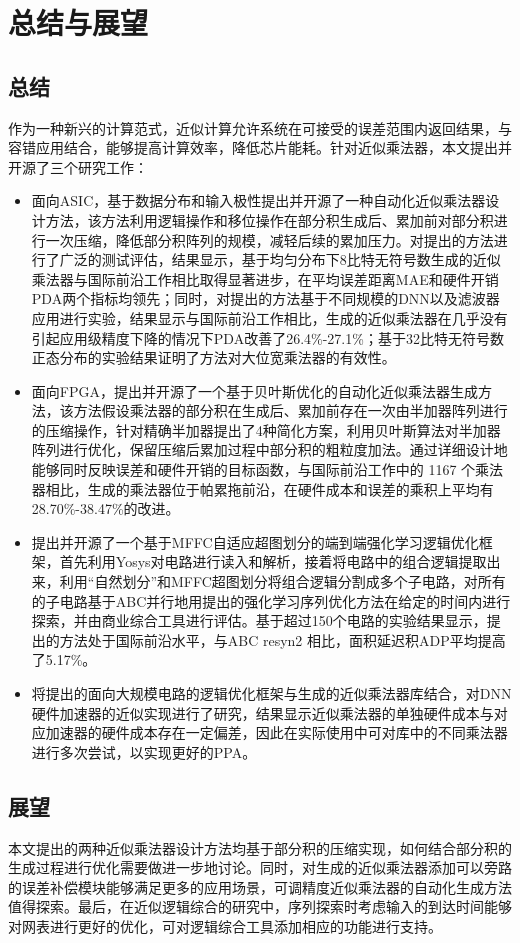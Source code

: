\chapter{总结与展望}

\section{总结}

作为一种新兴的计算范式，近似计算允许系统在可接受的误差范围内返回结果，与容错应用结合，能够提高计算效率，降低芯片能耗。针对近似乘法器，本文提出并开源了三个研究工作：
\begin{itemize}
    \item 面向ASIC，基于数据分布和输入极性提出并开源了一种自动化近似乘法器设计方法，该方法利用逻辑操作和移位操作在部分积生成后、累加前对部分积进行一次压缩，降低部分积阵列的规模，减轻后续的累加压力。对提出的方法进行了广泛的测试评估，结果显示，基于均匀分布下8比特无符号数生成的近似乘法器与国际前沿工作相比取得显著进步，在平均误差距离MAE和硬件开销PDA两个指标均领先；同时，对提出的方法基于不同规模的DNN以及滤波器应用进行实验，结果显示与国际前沿工作相比，生成的近似乘法器在几乎没有引起应用级精度下降的情况下PDA改善了26.4\%-27.1\%；基于32比特无符号数正态分布的实验结果证明了方法对大位宽乘法器的有效性。
    \item 面向FPGA，提出并开源了一个基于贝叶斯优化的自动化近似乘法器生成方法，该方法假设乘法器的部分积在生成后、累加前存在一次由半加器阵列进行的压缩操作，针对精确半加器提出了4种简化方案，利用贝叶斯算法对半加器阵列进行优化，保留压缩后累加过程中部分积的粗粒度加法。通过详细设计地能够同时反映误差和硬件开销的目标函数，与国际前沿工作中的 1167 个乘法器相比，生成的乘法器位于帕累拖前沿，在硬件成本和误差的乘积上平均有28.70\%-38.47\%的改进。
    \item 提出并开源了一个基于MFFC自适应超图划分的端到端强化学习逻辑优化框架，首先利用Yosys对电路进行读入和解析，接着将电路中的组合逻辑提取出来，利用“自然划分”和MFFC超图划分将组合逻辑分割成多个子电路，对所有的子电路基于ABC并行地用提出的强化学习序列优化方法在给定的时间内进行探索，并由商业综合工具进行评估。基于超过150个电路的实验结果显示，提出的方法处于国际前沿水平，与ABC resyn2 相比，面积延迟积ADP平均提高了5.17\%。
    \item 将提出的面向大规模电路的逻辑优化框架与生成的近似乘法器库结合，对DNN硬件加速器的近似实现进行了研究，结果显示近似乘法器的单独硬件成本与对应加速器的硬件成本存在一定偏差，因此在实际使用中可对库中的不同乘法器进行多次尝试，以实现更好的PPA。
\end{itemize}

\section{展望}

本文提出的两种近似乘法器设计方法均基于部分积的压缩实现，如何结合部分积的生成过程进行优化需要做进一步地讨论。同时，对生成的近似乘法器添加可以旁路的误差补偿模块能够满足更多的应用场景，可调精度近似乘法器的自动化生成方法值得探索。最后，在近似逻辑综合的研究中，序列探索时考虑输入的到达时间能够对网表进行更好的优化，可对逻辑综合工具添加相应的功能进行支持。